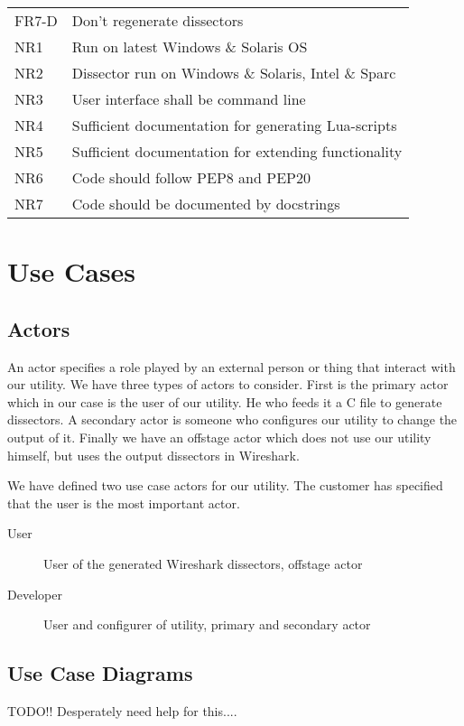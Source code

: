 \begin{table}[H]
\begin{tabular}{l l}
	FR7-D & Don't regenerate dissectors \\
	\addlinespace
	NR1 & Run on latest Windows \& Solaris OS \\
	NR2 & Dissector run on Windows \& Solaris, Intel \& Sparc \\
	NR3 & User interface shall be command line \\
	NR4 & Sufficient documentation for generating Lua-scripts \\
	NR5 & Sufficient documentation for extending functionality \\
	NR6 & Code should follow PEP8 and PEP20 \\
	NR7 & Code should be documented by docstrings \\
	\bottomrule
\end{tabular}
\end{table}

\section{Use Cases}
\label{sec:usecases}

\subsection{Actors}
An actor specifies a role played by an external person or thing that interact
with our utility. We have three types of actors to consider. First is the
primary actor which in our case is the user of our utility. He who feeds it a
C file to generate dissectors. A secondary actor is someone who configures our
utility to change the output of it. Finally we have an offstage actor which
does not use our utility himself, but uses the output dissectors in Wireshark.

We have defined two use case actors for our utility. The customer has
specified that the user is the most important actor.
\begin{description}
	\item[User] User of the generated Wireshark dissectors, offstage actor
	\item[Developer] User and configurer of utility, primary and secondary
		actor
\end{description}

\subsection{Use Case Diagrams}
TODO!! Desperately need help for this....

